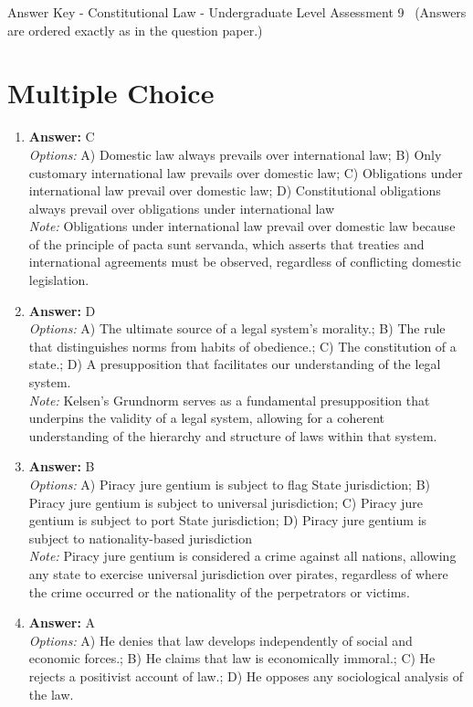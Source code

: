 \documentclass[12pt]{article}
\begin{document}
\begin{center}
Answer Key - Constitutional Law - Undergraduate Level Assessment 9 \
\small (Answers are ordered exactly as in the question paper.)
\end{center}

\section*{Multiple Choice}
\begin{enumerate}[label=\arabic*.]
\item \textbf{Answer:} C
\\ \textit{Options:} A) Domestic law always prevails over international law; B) Only customary international law prevails over domestic law; C) Obligations under international law prevail over domestic law; D) Constitutional obligations always prevail over obligations under international law
\\ \textit{Note:} Obligations under international law prevail over domestic law because of the principle of pacta sunt servanda, which asserts that treaties and international agreements must be observed, regardless of conflicting domestic legislation.
\item \textbf{Answer:} D
\\ \textit{Options:} A) The ultimate source of a legal system's morality.; B) The rule that distinguishes norms from habits of obedience.; C) The constitution of a state.; D) A presupposition that facilitates our understanding of the legal system.
\\ \textit{Note:} Kelsen's Grundnorm serves as a fundamental presupposition that underpins the validity of a legal system, allowing for a coherent understanding of the hierarchy and structure of laws within that system.
\item \textbf{Answer:} B
\\ \textit{Options:} A) Piracy jure gentium is subject to flag State jurisdiction; B) Piracy jure gentium is subject to universal jurisdiction; C) Piracy jure gentium is subject to port State jurisdiction; D) Piracy jure gentium is subject to nationality-based jurisdiction
\\ \textit{Note:} Piracy jure gentium is considered a crime against all nations, allowing any state to exercise universal jurisdiction over pirates, regardless of where the crime occurred or the nationality of the perpetrators or victims.
\item \textbf{Answer:} A
\\ \textit{Options:} A) He denies that law develops independently of social and economic forces.; B) He claims that law is economically immoral.; C) He rejects a positivist account of law.; D) He opposes any sociological analysis of the law.

\end{enumerate}
\end{document}
